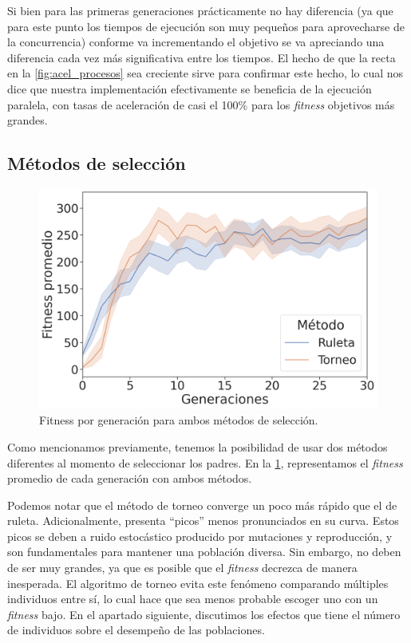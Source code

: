 \documentclass[twocolumn,spanish]{revtex4-1}
\begin{document}
Si bien para las primeras generaciones prácticamente no hay diferencia (ya que para este punto los tiempos de ejecución son muy pequeños para aprovecharse de la concurrencia) conforme va incrementando el objetivo se va apreciando una diferencia cada vez más significativa entre los tiempos. El hecho de que la recta en la \cref{fig:acel_procesos} sea creciente sirve para confirmar este hecho, lo cual nos dice que nuestra implementación efectivamente se beneficia de la ejecución paralela, con tasas de aceleración de casi el 100\% para los \textit{fitness} objetivos más grandes.

\subsection{Métodos de selección}
\begin{figure}[ht]
    \centering
    \includegraphics[width=0.9\linewidth]{eval_seleccion.png}
    \caption{Fitness por generación para ambos métodos de selección.}
    \label{fig:eval_seleccion}
\end{figure}

Como mencionamos previamente, tenemos la posibilidad de usar dos métodos diferentes al momento de seleccionar los padres. En la \cref{fig:eval_seleccion}, representamos el \textit{fitness} promedio de cada generación con ambos métodos. 

Podemos notar que el método de torneo converge un poco más rápido que el de ruleta. Adicionalmente, presenta ``picos'' menos pronunciados en su curva. Estos picos se deben a ruido estocástico producido por mutaciones y reproducción, y son fundamentales para mantener una población diversa. Sin embargo, no deben de ser muy grandes, ya que es posible que el \textit{fitness} decrezca de manera inesperada. El algoritmo de torneo evita este fenómeno comparando múltiples individuos entre sí, lo cual hace que sea menos probable escoger uno con un \textit{fitness} bajo. En el apartado siguiente, discutimos los efectos que tiene el número de individuos sobre el desempeño de las poblaciones.
\end{document}

